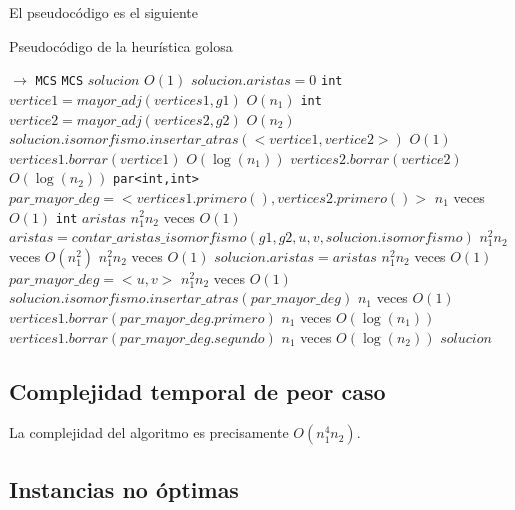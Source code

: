 El pseudocódigo es el siguiente

\begin{algorithm}[H]
  \begin{algorithmic}[1]
  \caption{Pseudocódigo de la heurística golosa}
  \label{algo:4-1}
     $\to$ \texttt{MCS}
      \State \texttt{MCS} $solucion$ 
        \Comment $O(1)$ 
      \State $solucion.aristas = 0$ 
      \State \texttt{int} $vertice1 = mayor\_adj(vertices1,g1)$ 
      \Comment $O(n_1)$ 
      \State \texttt{int} $vertice2 = mayor\_adj(vertices2,g2)$ 
      \Comment $O(n_2)$ 
      \State $solucion.isomorfismo.insertar\_atras(<vertice1,vertice2>)$
      \Comment $O(1)$
      \State $vertices1.borrar(vertice1)$ 
      \Comment $O(\log(n_1))$ 
      \State $vertices2.borrar(vertice2)$ 
      \Comment $O(\log(n_2))$
	  \State \texttt{par<int,int>}  $par\_mayor\_deg = <vertices1.primero(),vertices2.primero()>$ 
    \Comment $n_1$ veces $O(1)$
	  \State \texttt{int} $aristas$
    \Comment $n_1^2n_2$ veces $O(1)$
	  \State $ aristas = contar\_aristas\_isomorfismo(g1,g2,u,v, solucion.isomorfismo)$
    \Comment $n_1^2n_2$ veces $O(n_1^2)$
      \Comment $n_1^2n_2$ veces $O(1)$
      \State $solucion.aristas = aristas$
      \Comment $n_1^2n_2$ veces $O(1)$
      \State $par\_mayor\_deg = <u,v>$
      \Comment $n_1^2n_2$ veces $O(1)$
      \EndIf
	  \EndFor
	  \EndFor	 
	  \State  $solucion.isomorfismo.insertar\_atras(par\_mayor\_deg)$
      \Comment $n_1$ veces $O(1)$
	  \State $ vertices1.borrar(par\_mayor\_deg.primero)$
      \Comment $n_1$ veces $O(\log(n_1))$
	  \State $ vertices1.borrar(par\_mayor\_deg.segundo)$
      \Comment $n_1$ veces $O(\log(n_2))$
	  \EndWhile      
        \State \Return $solucion$
      \EndProcedure
	\end{algorithmic}
\end{algorithm}


\subsection{Complejidad temporal de peor caso}

La complejidad del algoritmo es precisamente $O(n_1^4 n_2)$.

\subsection{Instancias no óptimas}

